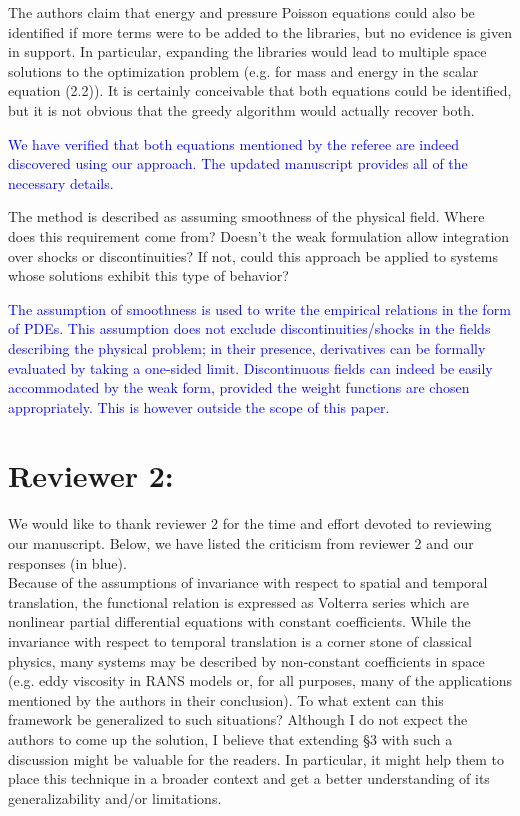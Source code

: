 \documentclass{article}
\newcommand{\response}{\textcolor{blue}}
\begin{document}
\medskip
The authors claim that energy and pressure Poisson
equations could also be identified if more terms were to be added to
the libraries, but no evidence is given in support.  In particular,
expanding the libraries would lead to multiple space solutions to the
optimization problem (e.g. for mass and energy in the scalar equation
(2.2)).  It is certainly conceivable that both equations could be
identified, but it is not obvious that the greedy algorithm would
actually recover both.

\medskip
\response{
We have verified that both equations mentioned by the referee are indeed discovered using our approach. The updated manuscript provides all of the necessary details.}

\medskip
The method is described as assuming smoothness of the
physical field.  Where does this requirement come from?  Doesn’t the
weak formulation allow integration over shocks or discontinuities?  If
not, could this approach be applied to systems whose solutions exhibit
this type of behavior?

\medskip
\response{
The assumption of smoothness is used to write the empirical relations in the form of PDEs. This assumption does not exclude discontinuities/shocks in the fields describing the physical problem; in their presence, derivatives can be formally evaluated by taking a one-sided limit. Discontinuous fields can indeed be easily accommodated by the weak form, provided the weight functions are chosen appropriately. This is however outside the scope of this paper.
}

\newpage

\section*{Reviewer 2:}
We would like to thank reviewer 2 for the time and effort devoted to reviewing our manuscript. Below, we have listed the criticism from reviewer 2 and our responses (in blue).\\

Because of the assumptions of invariance with respect to spatial and temporal translation, the functional relation is expressed as Volterra series which are nonlinear partial differential equations with constant coefficients.   While  the  invariance  with  respect  to  temporal  translation  is  a  corner  stone  of  classical  physics,  many  systems  may be described by non-constant coefficients in space (e.g.  eddy viscosity in RANS models or, for all purposes, many of the applications mentioned  by  the  authors  in  their  conclusion).   To  what  extent can this framework be generalized to such situations? Although I do not expect the authors to come up the solution,  I believe that extending §3 with such a discussion might be valuable for the readers.  In particular,  it might help them to place this technique in a broader context and get a better understanding of its generalizability and/or limitations.
    
\end{document}
